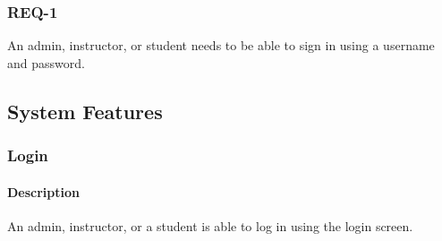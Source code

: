 \documentclass{article}
\begin{document}
\subsubsection{REQ-1}

An admin, instructor, or student needs to be able to sign in using a username and password.

\subsection{System Features}







\subsubsection{Login}




\paragraph{Description} An admin, instructor, or a student is able to log in using the login screen.
\end{document}
